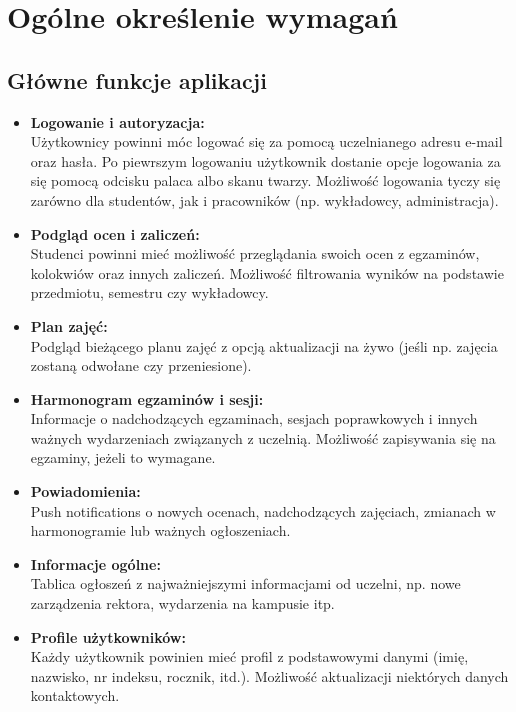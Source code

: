 \newpage
\section{Ogólne określenie wymagań}		%

\subsection{Główne funkcje aplikacji}

\begin{itemize}
	\item \textbf{Logowanie i autoryzacja:}
	      \\Użytkownicy powinni móc logować się za pomocą uczelnianego adresu e-mail oraz hasła. Po piewrszym logowaniu użytkownik dostanie opcje logowania za się pomocą odcisku palaca albo skanu twarzy. Możliwość logowania tyczy się zarówno dla studentów, jak i pracowników (np. wykładowcy, administracja).
	\item \textbf{Podgląd ocen i zaliczeń:}
	      \\Studenci powinni mieć możliwość przeglądania swoich ocen z egzaminów, kolokwiów oraz innych zaliczeń. Możliwość filtrowania wyników na podstawie przedmiotu, semestru czy wykładowcy.
	\item \textbf{Plan zajęć:}
	      \\Podgląd bieżącego planu zajęć z opcją aktualizacji na żywo (jeśli np. zajęcia zostaną odwołane czy przeniesione).
	\item \textbf{Harmonogram egzaminów i sesji:}
	      \\Informacje o nadchodzących egzaminach, sesjach poprawkowych i innych ważnych wydarzeniach związanych z uczelnią. Możliwość zapisywania się na egzaminy, jeżeli to wymagane.
	\item \textbf{Powiadomienia:}
	      \\Push notifications o nowych ocenach, nadchodzących zajęciach, zmianach w harmonogramie lub ważnych ogłoszeniach.
	\item \textbf{Informacje ogólne:}
	      \\Tablica ogłoszeń z najważniejszymi informacjami od uczelni, np. nowe zarządzenia rektora, wydarzenia na kampusie itp.
	\item \textbf{Profile użytkowników:}
	      \\Każdy użytkownik powinien mieć profil z podstawowymi danymi (imię, nazwisko, nr indeksu, rocznik, itd.). Możliwość aktualizacji niektórych danych kontaktowych.


\end{itemize}
